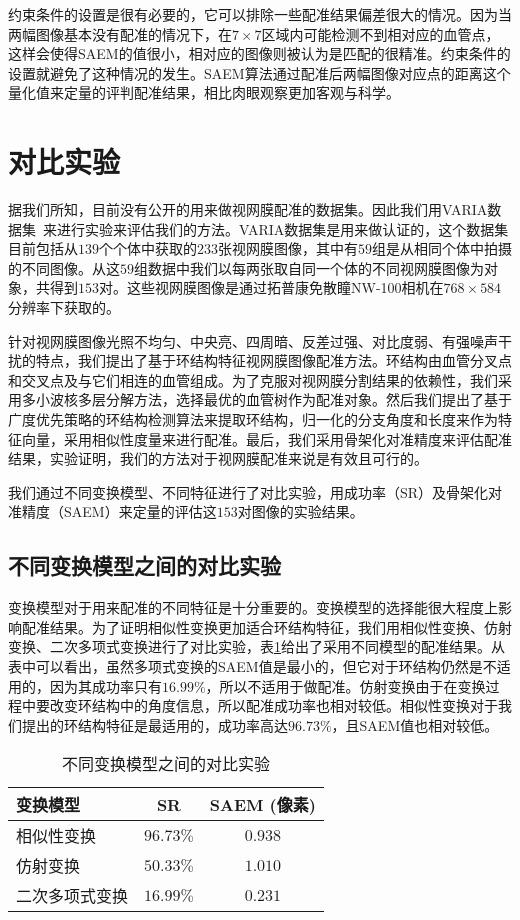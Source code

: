 约束条件的设置是很有必要的，它可以排除一些配准结果偏差很大的情况。因为当两幅图像基本没有配准的情况下，在$7 \times 7$区域内可能检测不到相对应的血管点，这样会使得SAEM的值很小，相对应的图像则被认为是匹配的很精准。约束条件的设置就避免了这种情况的发生。SAEM算法通过配准后两幅图像对应点的距离这个量化值来定量的评判配准结果，相比肉眼观察更加客观与科学。
\section{对比实验}
\label{}
据我们所知，目前没有公开的用来做视网膜配准的数据集。因此我们用VARIA数据集~\cite{ortega2009retinal,ortega2009personal}来进行实验来评估我们的方法。VARIA数据集是用来做认证的，这个数据集目前包括从$139$个个体中获取的$233$张视网膜图像，其中有$59$组是从相同个体中拍摄的不同图像。从这$59$组数据中我们以每两张取自同一个体的不同视网膜图像为对象，共得到$153$对。这些视网膜图像是通过拓普康免散瞳NW-100相机在$768 \times 584$分辨率下获取的。

针对视网膜图像光照不均匀、中央亮、四周暗、反差过强、对比度弱、有强噪声干扰的特点，我们提出了基于环结构特征视网膜图像配准方法。环结构由血管分叉点和交叉点及与它们相连的血管组成。为了克服对视网膜分割结果的依赖性，我们采用多小波核多层分解方法，选择最优的血管树作为配准对象。然后我们提出了基于广度优先策略的环结构检测算法来提取环结构，归一化的分支角度和长度来作为特征向量，采用相似性度量来进行配准。最后，我们采用骨架化对准精度来评估配准结果，实验证明，我们的方法对于视网膜配准来说是有效且可行的。

我们通过不同变换模型、不同特征进行了对比实验，用成功率（SR）及骨架化对准精度（SAEM）来定量的评估这$153$对图像的实验结果。

\subsection{不同变换模型之间的对比实验}

变换模型对于用来配准的不同特征是十分重要的。变换模型的选择能很大程度上影响配准结果。为了证明相似性变换更加适合环结构特征，我们用相似性变换、仿射变换、二次多项式变换进行了对比实验，表\ref{tab:models}给出了采用不同模型的配准结果。从表中可以看出，虽然多项式变换的SAEM值是最小的，但它对于环结构仍然是不适用的，因为其成功率只有$16.99\%$，所以不适用于做配准。仿射变换由于在变换过程中要改变环结构中的角度信息，所以配准成功率也相对较低。相似性变换对于我们提出的环结构特征是最适用的，成功率高达$96.73\%$，且SAEM值也相对较低。
\begin{table}
\caption{不同变换模型之间的对比实验}
\centering
\begin{tabular}{lcc}
\toprule
变换模型 & SR  & SAEM (像素)\\
\midrule
相似性变换 & $\mathbf{96.73\%}$ & $\mathbf{0.938}$ \\
仿射变换 & $50.33\%$ & $1.010$              \\
二次多项式变换 & $16.99\%$ & $0.231$\\
\bottomrule
\end{tabular}
\label{tab:models}
\end{table}

